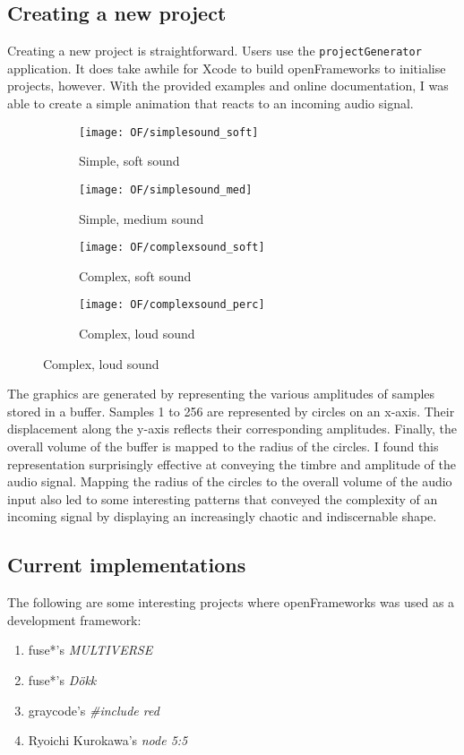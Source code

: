 \documentclass[../main_frameworkreview.tex]{subfiles}
\begin{document}
\subsection{Creating a new project}
Creating a new project is straightforward. Users use the \verb|projectGenerator| application. It does take awhile for Xcode to build openFrameworks to initialise projects, however. With the provided examples and online documentation, I was able to create a simple animation that reacts to an incoming audio signal.
\begin{figure}
  \begin{subfigure}{0.5\textwidth}
    \texttt{[image: OF/simplesound\_soft]}
    \caption{Simple, soft sound}
  \end{subfigure} 
 \begin{subfigure}{0.5\textwidth}
    \texttt{[image: OF/simplesound\_med]}
    \caption{Simple, medium sound}
  \end{subfigure}
  \begin{subfigure}{0.5\textwidth}
    \texttt{[image: OF/complexsound\_soft]}
    \caption{Complex, soft sound}
  \end{subfigure}
  \begin{subfigure}{0.5\textwidth}
    \texttt{[image: OF/complexsound\_perc]}
    \caption{Complex, loud sound}
  \end{subfigure}
\end{figure}
The graphics are generated by representing the various amplitudes of samples stored in a buffer. Samples 1 to 256 are represented by circles on an x-axis. Their displacement along the y-axis reflects their corresponding amplitudes. Finally, the overall volume of the buffer is mapped to the radius of the circles. I found this representation surprisingly effective at conveying the timbre and amplitude of the audio signal. Mapping the radius of the circles to the overall volume of the audio input also led to some interesting patterns that conveyed the complexity of an incoming signal by displaying an increasingly chaotic and indiscernable shape.

\subsection{Current implementations}
The following are some interesting projects where openFrameworks was used as a development framework:

\begin{enumerate}
\item fuse*'s \textit{MULTIVERSE}\cite{multiverse}
\item fuse*'s \textit{D\"okk}\cite{dokk}
\item graycode's \textit{\#include red}\cite{includered}
\item Ryoichi Kurokawa's \textit{node 5:5}\cite{KurokawaNode}
\end{enumerate}
\end{document}
